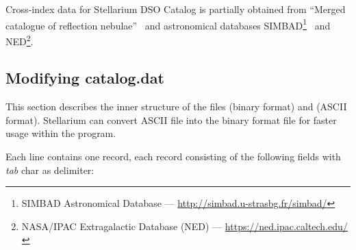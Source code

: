 Cross-index data for Stellarium DSO Catalog is partially obtained from ``Merged catalogue of reflection nebulae''~\cite{2003A&A...399..141M} and astronomical databases SIMBAD\footnote{SIMBAD Astronomical Database --- \url{http://simbad.u-strasbg.fr/simbad/}}~\cite{2000A&AS..143....9W} and NED\footnote{NASA/IPAC Extragalactic Database (NED) --- \url{https://ned.ipac.caltech.edu/}}.

\subsection{Modifying catalog.dat}
\label{sec:dso:modifyingCatalog.dat}

This section describes the inner structure of the files 
(binary format) and  (ASCII format).
Stellarium can convert ASCII file into the binary format file for faster usage
within the program.

Each line contains one record, each record consisting of the following
fields with \emph{tab} char as delimiter:

